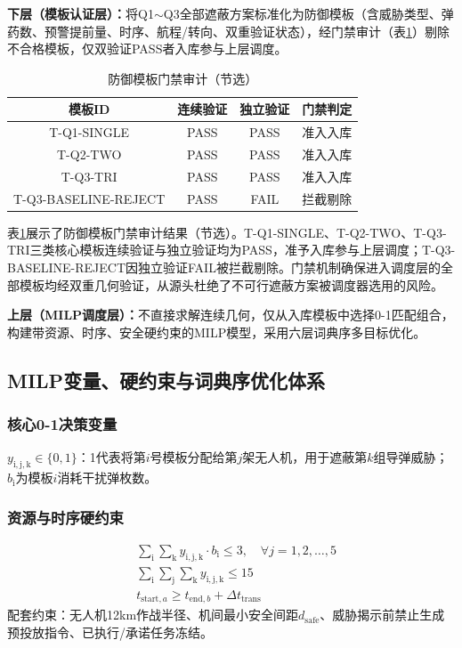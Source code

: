 \documentclass[withoutpreface,bwprint]{cumcmthesis}
\renewcommand{\textbf}[1]{{\song\bfseries #1}}
\begin{document}
\textbf{下层（模板认证层）：}将Q1$\sim$Q3全部遮蔽方案标准化为防御模板（含威胁类型、弹药数、预警提前量、时序、航程/转向、双重验证状态），经门禁审计（表\ref{tab:template_gate}）剔除不合格模板，仅双验证PASS者入库参与上层调度。
	\begin{table}[htbp]
		\centering
		\caption{防御模板门禁审计（节选）}
		\label{tab:template_gate}
		\begin{tabular}{cccc}
			\toprule
			模板ID & 连续验证 & 独立验证 & 门禁判定 \\
			\midrule
			T-Q1-SINGLE & PASS & PASS & 准入入库 \\
			T-Q2-TWO & PASS & PASS & 准入入库 \\
			T-Q3-TRI & PASS & PASS & 准入入库 \\
			T-Q3-BASELINE-REJECT & PASS & FAIL & 拦截剔除 \\
			\bottomrule
		\end{tabular}
	\end{table}
	
	表\ref{tab:template_gate}展示了防御模板门禁审计结果（节选）。T-Q1-SINGLE、T-Q2-TWO、T-Q3-TRI三类核心模板连续验证与独立验证均为PASS，准予入库参与上层调度；T-Q3-BASELINE-REJECT因独立验证FAIL被拦截剔除。门禁机制确保进入调度层的全部模板均经双重几何验证，从源头杜绝了不可行遮蔽方案被调度器选用的风险。
	
\textbf{上层（MILP调度层）：}不直接求解连续几何，仅从入库模板中选择0-1匹配组合，构建带资源、时序、安全硬约束的MILP模型，采用六层词典序多目标优化。

\subsection{MILP变量、硬约束与词典序优化体系}
\subsubsection{核心0-1决策变量}
$y_{\mathrm{i},\mathrm{j},\mathrm{k}}\in\{0,1\}$：1代表将第$i$号模板分配给第$j$架无人机，用于遮蔽第$k$组导弹威胁；$b_{\mathrm{i}}$为模板$i$消耗干扰弹枚数。

\subsubsection{资源与时序硬约束}
\begin{align}
	&\sum_{\mathrm{i}}\sum_{\mathrm{k}} y_{\mathrm{i},\mathrm{j},\mathrm{k}} \cdot b_{\mathrm{i}} \le 3,\quad \forall j=1,2,\dots,5 \tag{单机载弹上限}\\
	&\sum_{\mathrm{i}}\sum_{\mathrm{j}}\sum_{\mathrm{k}} y_{\mathrm{i},\mathrm{j},\mathrm{k}} \le 15 \tag{全系统弹药上限}\\
	&t_{\text{start},a} \ge t_{\text{end},b} + \Delta t_{\text{trans}} \tag{无人机任务无时间冲突}
\end{align}
配套约束：无人机12km作战半径、机间最小安全间距$d_{\mathrm{safe}}$、威胁揭示前禁止生成预投放指令、已执行/承诺任务冻结。
\end{document}

